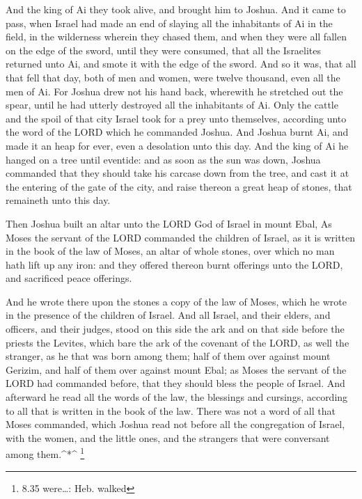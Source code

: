  And the king of Ai they took alive, and brought him to
Joshua.  And it came to pass, when Israel had made an end
of slaying all the inhabitants of Ai in the field, in the wilderness
wherein they chased them, and when they were all fallen on the edge of
the sword, until they were consumed, that all the Israelites returned
unto Ai, and smote it with the edge of the sword.  And so
it was, that all that fell that day, both of men and women, were twelve
thousand, even all the men of Ai.  For Joshua drew not his
hand back, wherewith he stretched out the spear, until he had utterly
destroyed all the inhabitants of Ai.  Only the cattle and
the spoil of that city Israel took for a prey unto themselves, according
unto the word of the LORD which he commanded Joshua.  And
Joshua burnt Ai, and made it an heap for ever, even a desolation unto
this day.  And the king of Ai he hanged on a tree until
eventide: and as soon as the sun was down, Joshua commanded that they
should take his carcase down from the tree, and cast it at the entering
of the gate of the city, and raise thereon a great heap of stones, that
remaineth unto this day.

 Then Joshua built an altar unto the LORD God of Israel in
mount Ebal,  As Moses the servant of the LORD commanded the
children of Israel, as it is written in the book of the law of Moses, an
altar of whole stones, over which no man hath lift up any iron: and they
offered thereon burnt offerings unto the LORD, and sacrificed peace
offerings.

 And he wrote there upon the stones a copy of the law of
Moses, which he wrote in the presence of the children of Israel.
 And all Israel, and their elders, and officers, and their
judges, stood on this side the ark and on that side before the priests
the Levites, which bare the ark of the covenant of the LORD, as well the
stranger, as he that was born among them; half of them over against
mount Gerizim, and half of them over against mount Ebal; as Moses the
servant of the LORD had commanded before, that they should bless the
people of Israel.  And afterward he read all the words of
the law, the blessings and cursings, according to all that is written in
the book of the law.  There was not a word of all that
Moses commanded, which Joshua read not before all the congregation of
Israel, with the women, and the little ones, and the strangers that were
conversant among them.\^{}*\^{} \footnote{8.35 were\ldots: Heb. walked}

